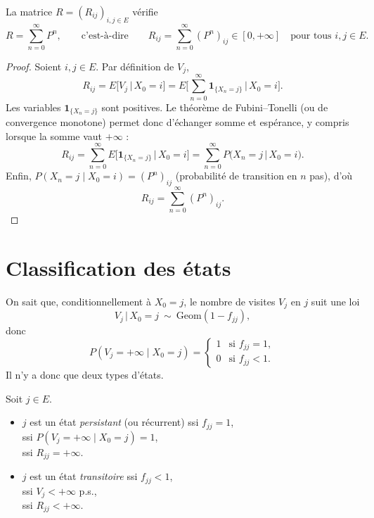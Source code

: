 \begin{proposition}
La matrice $R=(R_{ij})_{i,j\in E}$ vérifie
\[
R=\sum_{n=0}^{\infty}P^n,
\qquad\text{c'est-à-dire}\qquad
R_{ij}=\sum_{n=0}^{\infty}(P^n)_{ij}\in[0,+\infty]\quad\text{pour tous } i,j\in E.
\]
\end{proposition}

\begin{proof}
Soient $i,j\in E$. Par définition de $V_j$,
\[
R_{ij}=E\big[V_j\,\big|\,X_0=i\big]
=E\Big[\sum_{n=0}^{\infty}\mathbf 1_{\{X_n=j\}}\,\Big|\,X_0=i\Big].
\]
Les variables $\mathbf 1_{\{X_n=j\}}$ sont positives. Le théorème de Fubini--Tonelli (ou de convergence monotone) permet donc d'échanger somme et espérance, y compris lorsque la somme vaut $+\infty$ :
\[
R_{ij}=\sum_{n=0}^{\infty}E\big[\mathbf 1_{\{X_n=j\}}\,\big|\,X_0=i\big]
=\sum_{n=0}^{\infty}P\big(X_n=j\,\big|\,X_0=i\big).
\]
Enfin, $P(X_n=j\mid X_0=i)=(P^n)_{ij}$ (probabilité de transition en $n$ pas), d'où
\[
R_{ij}=\sum_{n=0}^{\infty}(P^n)_{ij}.
\]
\end{proof}

\section{Classification des états}

On sait que, conditionnellement à $X_0 = j$, le nombre de visites $V_j$ en $j$ suit une loi
\[
V_j \,\big|\, X_0 = j \ \sim\ \mathrm{Geom}(1 - f_{jj}),
\]
donc
\[
P(V_j = +\infty \mid X_0 = j) =
\begin{cases}
1 & \text{si } f_{jj} = 1,\\
0 & \text{si } f_{jj} < 1.
\end{cases}
\]
Il n'y a donc que deux types d'états.

\begin{definition}
Soit $j \in E$.
\begin{itemize}
  \item $j$ est un état \emph{persistant} (ou récurrent) ssi $f_{jj} = 1$, \\
  ssi $P(V_j = +\infty \mid X_0 = j) = 1$, \\
  ssi $R_{jj} = +\infty$.
  \item $j$ est un état \emph{transitoire} ssi $f_{jj} < 1$, \\
  ssi $V_j < +\infty$ p.s., \\
  ssi $R_{jj} < +\infty$.
\end{itemize}
\end{definition}

